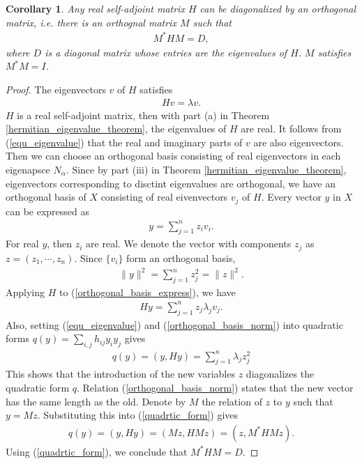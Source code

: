 \documentclass[11pt]{book}
\newtheorem{corollary}{Corollary}[theorem]
\theoremstyle{definition}
\numberwithin{equation}{chapter}
\begin{document}
\begin{corollary}\label{self-adjoint-diagonal}
Any real self-adjoint matrix $H$ can be diagonalized by an orthogonal matrix, i.e. there is an orthognal matrix $M$ such that 
\begin{align*}
    M^* H M = D,
\end{align*}
where $D$ is a diagonal matrix whose entries are the eigenvalues of $H$. $M$ satisfies $M^*M = I$.
\end{corollary}
\begin{proof}
The eigenvectors $v$ of $H$ satisfies 
\begin{align}\label{equ_eigenvalue}
    Hv = \lambda v.
\end{align}
$H$ is a real self-adjoint matrix, then with part (a) in Theorem \ref{hermitian_eigenvalue_theorem}, the eigenvalues of $H$ are real. It follows from (\ref{equ_eigenvalue}) that the real and imaginary parts of $v$ are also eigenvectors. Then we can choose an orthogonal basis consisting of real eigenvectors in each eigenapsce $N_\alpha$. Since by part (iii) in Theorem \ref{hermitian_eigenvalue_theorem}, eigenvectors corresponding to disctint eigenvalues are orthogonal, we have an orthogonal basis of $X$ consisting of real eivenvectors $v_j$ of $H$. Every vector $y$ in $X$ can be expressed as
\begin{align}\label{orthogonal_basis_express}
    y = \sum^n_{j=1} z_i v_i.
\end{align}
For real $y$, then $z_i$ are real. We denote the vector with components $z_j$ as $z = \left(z_1, \cdots, z_n\right)$. Since $\{v_i\}$ form an orthogonal basis, 
\begin{align}\label{orthogonal_basis_norm}
    \|y\|^2 = \sum^n_{j=1} z_j^2 = \|z\|^2.
\end{align}
Applying $H$ to (\ref{orthogonal_basis_express}), we have \begin{align*}
    Hy = \sum^n_{j=1} z_j \lambda_j v_j.
\end{align*}
Also, setting (\ref{equ_eigenvalue}) and (\ref{orthogonal_basis_norm}) into quadratic forms $q(y) = \sum_{i,j}h_{ij} y_i y_j$ gives
\begin{align}\label{quadrtic_form}
    q(y) = (y, Hy) = \sum^n_{j=1} \lambda_j z_j^2
\end{align} 
This shows that the introduction of the new variables $z$ diagonalizes the quadratic form $q$. Relation (\ref{orthogonal_basis_norm}) states that the new vector has the same length as the old. Denote by $M$ the relation of $z$ to $y$ such that $y = Mz$. Substituting this into (\ref{quadrtic_form}) gives
\begin{align*}
    q(y) = (y, Hy) = (Mz, HMz) = (z, M^*HMz).
\end{align*}
Using (\ref{quadrtic_form}), we conclude that $M^*HM = D$.
\end{proof}
\end{document}
